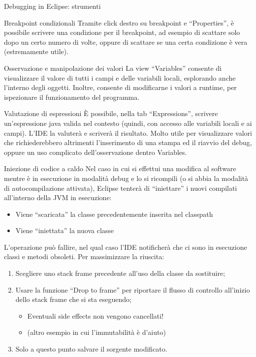 \documentclass[presentation]{beamer}
\begin{document}
\begin{frame}[allowframebreaks]{Debugging in Eclipse: strumenti}
	\begin{block}{Breakpoint condizionali}
		Tramite click destro su breakpoint e ``Properties'', è possibile scrivere una condizione per il breakpoint, ad esempio di scattare solo dopo un certo numero di volte, oppure di scattare se una certa condizione è vera (estremamente utile).
	\end{block}
	\begin{block}{Osservazione e manipolazione dei valori}
		La view ``Variables'' consente di visualizzare il valore di tutti i campi e delle variabili locali, esplorando anche l'interno degli oggetti. Inoltre, consente di modificarne i valori a runtime, per ispezionare il funzionamento del programma.
	\end{block}
	\begin{block}{Valutazione di espressioni}
		È possibile, nella tab ``Expressions'', scrivere un'espressione java valida nel contesto (quindi, con accesso alle variabili locali e ai campi). L'IDE la valuterà e scriverà il risultato. Molto utile per visualizzare valori che richiederebbero altrimenti l'inserimento di una stampa ed il riavvio del debug, oppure un uso complicato dell'osservazione dentro Variables.
	\end{block}
	\begin{block}{Iniezione di codice a caldo}
		Nel caso in cui si effettui una modifica al software mentre è in esecuzione in modalità debug e lo si ricompili (o si abbia la modalità di autocompilazione attivata), Eclipse tenterà di ``iniettare'' i nuovi compilati all'interno della JVM in esecuzione:
		\begin{itemize}
			\item Viene ``scaricata'' la classe precedentemente inserita nel classpath
			\item Viene ``iniettata'' la nuova classe
		\end{itemize}
		L'operazione può fallire, nel qual caso l'IDE notificherà che ci sono in esecuzione classi e metodi obsoleti. Per massimizzare la riuscita:
		\begin{enumerate}
			\item Scegliere uno stack frame precedente all'uso della classe da sostituire;
			\item Usare la funzione ``Drop to frame'' per riportare il flusso di controllo all'inizio dello stack frame che si sta eseguendo;
			\begin{itemize}
				\item Eventuali side effects non vengono cancellati!
				\item (altro esempio in cui l'immutabilità è d'aiuto)
			\end{itemize}
			\item Solo a questo punto salvare il sorgente modificato.
		\end{enumerate}
	\end{block}
\end{frame}
\end{document}
